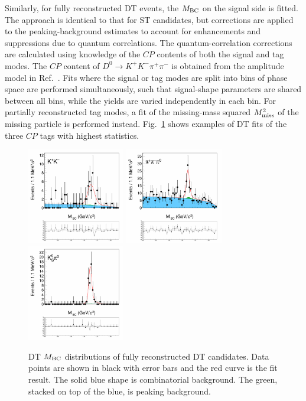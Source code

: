 \documentclass[12pt, a4paper, notitlepage, onecolumn]{article}
\begin{document}
Similarly, for fully reconstructed DT events, the $M_{\rm BC}$ on the signal side is fitted. The approach is identical to that for ST candidates, but corrections are applied to the peaking-background estimates to account for enhancements and suppressions due to quantum correlations. The quantum-correlation corrections are calculated using knowledge of the $C\!P$ contents of both the signal and tag modes. The $C\!P$ content of $D^0\to K^+K^-\pi^+\pi^-$ is obtained from the amplitude model in Ref.~\cite{LHCb-PAPER-2018-041}. Fits where the signal or tag modes are split into bins of phase space are performed simultaneously, such that signal-shape parameters are shared between all bins, while the yields are varied independently in each bin. For partially reconstructed tag modes, a fit of the missing-mass squared $M_{\rm miss}^2$ of the missing particle is performed instead. Fig.~\ref{figure:DT_MBC} shows examples of DT fits of the three $C\!P$ tags with highest statistics.

\begin{figure}[htb]
    \centering
    \includegraphics[height=4.2cm,trim={1.0cm 13.5cm 2.5cm 1.5cm},clip]{Plots/DoubleTagYield_DoubleTag_CP_KKpipi_vs_KK_SignalBin0.png}
    \includegraphics[height=4.2cm,trim={5.5cm 13.5cm 2.5cm 1.5cm},clip]{Plots/DoubleTagYield_DoubleTag_CP_KKpipi_vs_pipipi0_SignalBin0.png}
    \includegraphics[height=4.2cm,trim={5.5cm 13.5cm 2.5cm 1.5cm},clip]{Plots/DoubleTagYield_DoubleTag_CP_KKpipi_vs_KSpi0_SignalBin0.png}
    \caption{DT $M_{\rm BC}$ distributions of fully reconstructed DT candidates. Data points are shown in black with error bars and the red curve is the fit result. The solid blue shape is combinatorial background. The green, stacked on top of the blue, is peaking background.}
    \label{figure:DT_MBC}
\end{figure}
\end{document}
